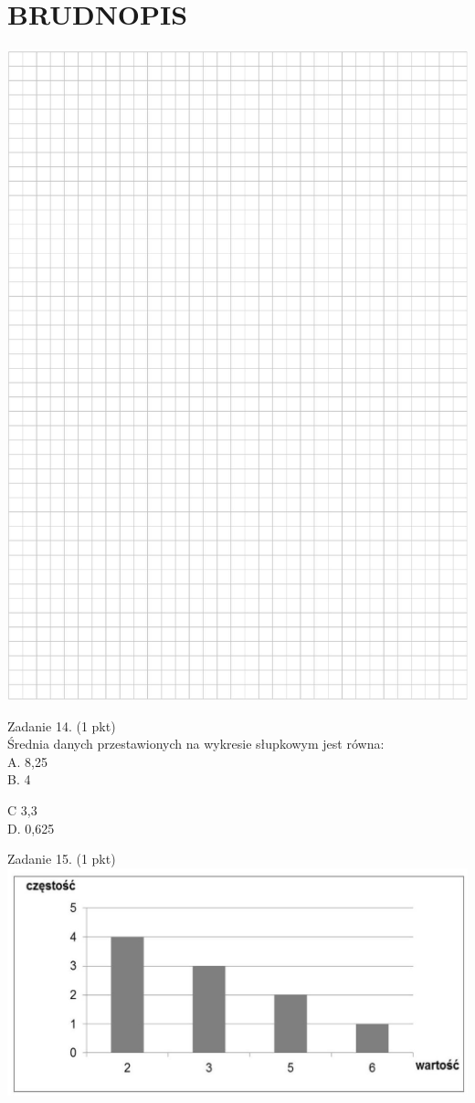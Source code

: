 \documentclass[10pt]{article}
\begin{document}
\section*{BRUDNOPIS}
\begin{center}
\includegraphics[max width=\textwidth]{2024_11_21_b31e6de468170710de69g-05}
\end{center}

Zadanie 14. (1 pkt)\\
Średnia danych przestawionych na wykresie słupkowym jest równa:\\
A. 8,25\\
B. 4

C 3,3\\
D. 0,625

Zadanie 15. (1 pkt)\\
\includegraphics[max width=\textwidth, center]{2024_11_21_b31e6de468170710de69g-06}
\end{document}
